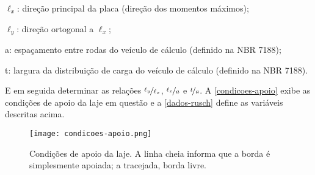 \begin{alineas}[label=\textbullet]
  \item $ \ell_x $: direção principal da placa (direção dos momentos máximos);
  \item $ \ell_y $: direção ortogonal a $ \ell_x $;
  \item a: espaçamento entre rodas do veículo de cálculo (definido na NBR 7188);
  \item t: largura da distribuição de carga do veículo de cálculo (definido na NBR 7188).
\end{alineas}


E em seguida determinar as relações $ \nicefrac{\ell_y}{\ell_x} $, $ \nicefrac{\ell_x}{a} $ e $ \nicefrac{t}{a} $. A \autoref{condicoes-apoio} exibe as condições de apoio da laje em questão e a \autoref{dados-rusch} define as variáveis descritas acima.

\begin{figure}[htb]
	\caption{\label{condicoes-apoio}Condições de apoio da laje. A linha cheia informa que a borda é simplesmente apoiada; a tracejada, borda livre.}
	\begin{center}
	    \texttt{[image: condicoes-apoio.png]}
	\end{center}
\end{figure}

\begin{table}[htb]
\end{table}

